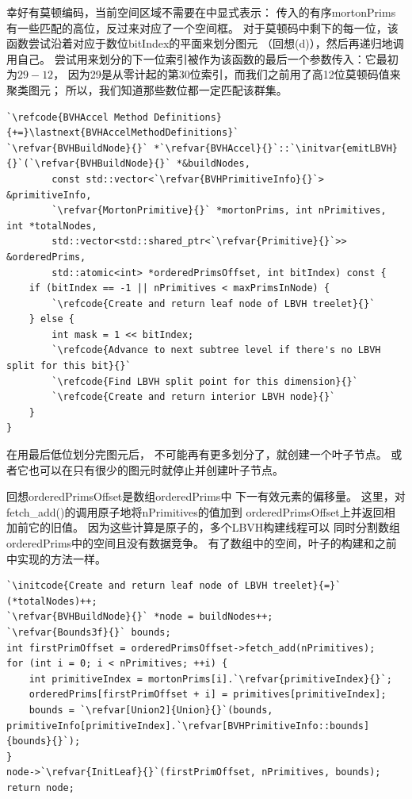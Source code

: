 幸好有莫顿编码，当前空间区域不需要在中显式表示：
传入的有序{\ttfamily mortonPrims}有一些匹配的高位，反过来对应了一个空间框。
对于莫顿码中剩下的每一位，该函数尝试沿着对应于数位{\ttfamily bitIndex}的平面来划分图元
（回想(d)），然后再递归地调用自己。
尝试用来划分的下一位索引被作为该函数的最后一个参数传入：它最初为$29-12$，
因为29是从零计起的第30位索引，而我们之前用了高12位莫顿码值来聚类图元；
所以，我们知道那些数位都一定匹配该群集。
\begin{lstlisting}
`\refcode{BVHAccel Method Definitions}{+=}\lastnext{BVHAccelMethodDefinitions}`
`\refvar{BVHBuildNode}{}` *`\refvar{BVHAccel}{}`::`\initvar{emitLBVH}{}`(`\refvar{BVHBuildNode}{}` *&buildNodes,
        const std::vector<`\refvar{BVHPrimitiveInfo}{}`> &primitiveInfo,
        `\refvar{MortonPrimitive}{}` *mortonPrims, int nPrimitives, int *totalNodes,
        std::vector<std::shared_ptr<`\refvar{Primitive}{}`>> &orderedPrims,
        std::atomic<int> *orderedPrimsOffset, int bitIndex) const {
    if (bitIndex == -1 || nPrimitives < maxPrimsInNode) {
        `\refcode{Create and return leaf node of LBVH treelet}{}`
    } else {
        int mask = 1 << bitIndex;
        `\refcode{Advance to next subtree level if there's no LBVH split for this bit}{}`
        `\refcode{Find LBVH split point for this dimension}{}`
        `\refcode{Create and return interior LBVH node}{}`
    }
}
\end{lstlisting}

在用最后低位划分完图元后，
不可能再有更多划分了，就创建一个叶子节点。
或者它也可以在只有很少的图元时就停止并创建叶子节点。

回想{\ttfamily orderedPrimsOffset}是数组{\ttfamily orderedPrims}中
下一有效元素的偏移量。
这里，对{\ttfamily fetch\_add()}的调用原子地将{\ttfamily nPrimitives}的值加到\newline
{\ttfamily orderedPrimsOffset}上并返回相加前它的旧值。
因为这些计算是原子的，多个LBVH构建线程可以
同时分割数组{\ttfamily orderedPrims}中的空间且没有数据竞争。
有了数组中的空间，叶子的构建和之前中实现的方法一样。
\begin{lstlisting}
`\initcode{Create and return leaf node of LBVH treelet}{=}`
(*totalNodes)++;
`\refvar{BVHBuildNode}{}` *node = buildNodes++;
`\refvar{Bounds3f}{}` bounds;
int firstPrimOffset = orderedPrimsOffset->fetch_add(nPrimitives);
for (int i = 0; i < nPrimitives; ++i) {
    int primitiveIndex = mortonPrims[i].`\refvar{primitiveIndex}{}`;
    orderedPrims[firstPrimOffset + i] = primitives[primitiveIndex];
    bounds = `\refvar[Union2]{Union}{}`(bounds, primitiveInfo[primitiveIndex].`\refvar[BVHPrimitiveInfo::bounds]{bounds}{}`);
}
node->`\refvar{InitLeaf}{}`(firstPrimOffset, nPrimitives, bounds);
return node;
\end{lstlisting}

